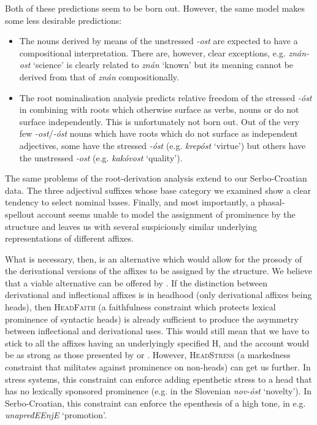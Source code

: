 \documentclass[output=paper]{langsci/langscibook}
\begin{document}
Both of these predictions seem to be born out. However, the same model makes some less desirable predictions: 
\begin{itemize}
\item The nouns derived by means of the unstressed \textit{-ost} are expected to have a compositional interpretation. There are, however, clear exceptions, e.g. \textit{znán-ost} `science' is clearly related to \textit{znán} `known' but its meaning cannot be derived from that of \textit{znán} compositionally. 
\item The root nominalisation analysis predicts relative freedom of the stressed \textit{-óst} in combining with roots which otherwise surface as verbs, nouns or do not surface independently. This is unfortunately not born out. Out of the very few \textit{-ost}/\textit{-óst} nouns which have roots which do not surface as independent adjectives, some have the stressed \textit{-óst} (e.g. \textit{krepóst} `virtue') but others have the unstressed \textit{-ost} (e.g. \textit{kakóvost} `quality'). 
\end{itemize}

The same problems of the root-derivation analysis extend to our Serbo-Croatian data. The three adjectival suffixes whose base category we examined show a clear tendency to select nominal bases. Finally, and most importantly, a phasal-spellout account seems unable to model the assignment of prominence by the structure and leaves us with several suspiciously similar underlying representations of different affixes. 

What is necessary, then, is an alternative which would allow for the prosody of the derivational versions of the affixes to be assigned by the structure.  We believe that a viable alternative can be offered by \cite{Revithiadou1999}. If the distinction between derivational and inflectional affixes is in headhood (only derivational affixes being heads), then \textsc{HeadFaith} (a faithfulness constraint which protects lexical prominence of syntactic heads) is already sufficient to produce the asymmetry between inflectional and derivational uses. This would still mean that we have to stick to all the affixes having an underlyingly specified H, and the account would be as strong as those presented by \cite{Mar2002} or \citet{Arsim2013}. However, \textsc{HeadStress} (a markedness constraint that militates against prominence on non-heads) can get us further. In stress systems, this constraint can enforce adding epenthetic stress to a head that has no lexically sponsored prominence (e.g. in the Slovenian \textit{nov-óst} `novelty'). In Serbo-Croatian, this constraint can enforce the epenthesis of a high tone, in e.g. \textit{unapređEEnjE} `promotion'. 
\end{document}
